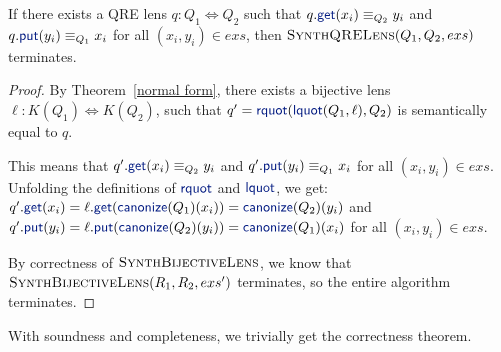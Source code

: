 \documentclass[acmsmall,review,anonymous]{acmart}
\newcommand{\kw}[1]{\textcolor{dkblue}{\ensuremath{\mathsf{#1}}}}
\newcommand{\canonize}{\ensuremath{\kw{canonize}}}
\newcommand{\get}{\ensuremath{\kw{get}}}
\newcommand{\lput}{\ensuremath{\kw{put}}}
\newcommand{\lquot}{\ensuremath{\kw{lquot}}}
\newcommand{\rquot}{\ensuremath{\kw{rquot}}}
\begin{document}
\begin{lemma}
  If there exists a QRE lens $q : Q_1 \Leftrightarrow Q_2$ such that
  $q.\get(x_i) \equiv_{Q_2} y_i$ and $q.\lput(y_i) \equiv_{Q_1} x_i$ for all
  $(x_i,y_i)\in exs$, then $\textproc{SynthQRELens}(Q_1,Q_2,exs)$ terminates.
\end{lemma}
\begin{proof}
  By Theorem~\ref{normal form}, there exists a bijective lens $\ell : K(Q_1)
  \Leftrightarrow K(Q_2)$, such that $q' = \rquot(\lquot(Q_1, \ell), Q_2)$ is
  semantically equal to $q$.

  This means that $q'.\get(x_i) \equiv_{Q_2} y_i$ and $q'.\lput(y_i)
  \equiv_{Q_1} x_i$ for all $(x_i,y_i)\in exs$. Unfolding the definitions of
  $\rquot$ and $\lquot$, we get:\\
  $q'.\get(x_i) = \ell.\get(\canonize(Q_1)(x_i)) = \canonize(Q_2)(y_i)$ and\\
  $q'.\lput(y_i) = \ell.\lput(\canonize(Q_2)(y_i)) = \canonize(Q_1)(x_i)$ for all
  $(x_i,y_i)\in exs$.

  By correctness of $\textproc{SynthBijectiveLens}$, we know that
  $\Call{SynthBijectiveLens}{R_1,R_2,exs'}$ terminates, so the entire algorithm
  terminates. 
\end{proof}

With soundness and completeness, we trivially get the correctness theorem.
\end{document}
